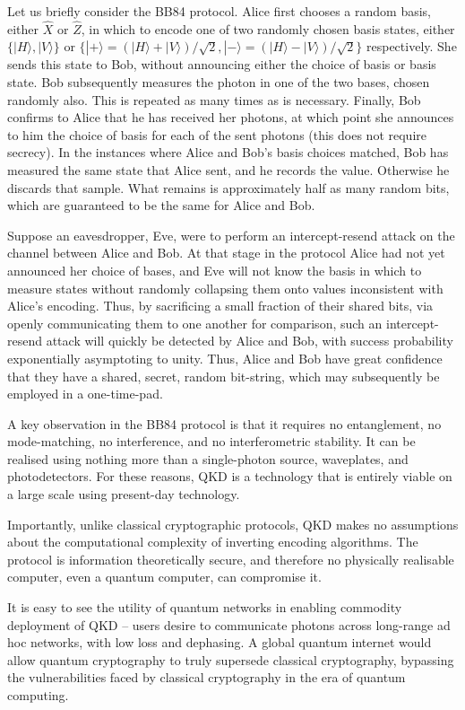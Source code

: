 \documentclass[aps,rmp,twocolumn,amsmath,amssymb,nofootinbib,superscriptaddress]{revtex4}
\newcommand{\ket}[1]{|#1\rangle}
\begin{document}
Let us briefly consider the BB84 protocol. Alice first chooses a random basis, either $\hat{X}$ or $\hat{Z}$, in which to encode one of two randomly chosen basis states, either \mbox{$\{\ket{H},\ket{V}\}$} or \mbox{$\{\ket{+}=(\ket{H}+\ket{V})/\sqrt{2},\ket{-}=(\ket{H}-\ket{V})/\sqrt{2}\}$} respectively. She sends this state to Bob, without announcing either the choice of basis or basis state. Bob subsequently measures the photon in one of the two bases, chosen randomly also. This is repeated as many times as is necessary. Finally, Bob confirms to Alice that he has received her photons, at which point she announces to him the choice of basis for each of the sent photons (this does not require secrecy). In the instances where Alice and Bob's basis choices matched, Bob has measured the same state that Alice sent, and he records the value. Otherwise he discards that sample. What remains is approximately half as many random bits, which are guaranteed to be the same for Alice and Bob.

Suppose an eavesdropper, Eve, were to perform an intercept-resend attack on the channel between Alice and Bob. At that stage in the protocol Alice had not yet announced her choice of bases, and Eve will not know the basis in which to measure states without randomly collapsing them onto values inconsistent with Alice's encoding. Thus, by sacrificing a small fraction of their shared bits, via openly communicating them to one another for comparison, such an intercept-resend attack will quickly be detected by Alice and Bob, with success probability exponentially asymptoting to unity. Thus, Alice and Bob have great confidence that they have a shared, secret, random bit-string, which may subsequently be employed in a one-time-pad.

A key observation in the BB84 protocol is that it requires no entanglement, no mode-matching, no interference, and no interferometric stability. It can be realised using nothing more than a single-photon source, waveplates, and photodetectors. For these reasons, QKD is a technology that is entirely viable on a large scale using present-day technology.

Importantly, unlike classical cryptographic protocols, QKD makes no assumptions about the computational complexity of inverting encoding algorithms. The protocol is information theoretically secure, and therefore no physically realisable computer, even a quantum computer, can compromise it.

It is easy to see the utility of quantum networks in enabling commodity deployment of QKD -- users desire to communicate photons across long-range ad hoc networks, with low loss and dephasing. A global quantum internet would allow quantum cryptography to truly supersede classical cryptography, bypassing the vulnerabilities faced by classical cryptography in the era of quantum computing.
\end{document}
